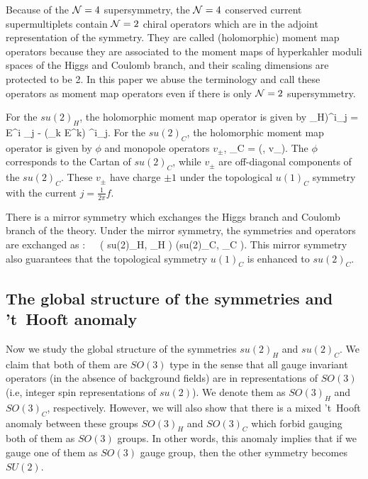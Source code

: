 \documentclass[a4paper,11pt]{article}
\def\CN{{\cal N}}
\def\beq#1\eeq{\begin{align}#1\end{align}}
\begin{document}
Because of the $\CN=4$ supersymmetry, the $\CN=4$ conserved current supermultiplets contain $\CN=2$ chiral operators which are in the adjoint representation of the symmetry.
They are called (holomorphic) moment map operators because they are associated to the moment maps of hyperkahler moduli spaces of the Higgs and Coulomb branch,
and their scaling dimensions are protected to be 2. In this paper we abuse the terminology 
and call these operators as moment map operators even if there is only $\CN=2$ supersymmetry.

For the $su(2)_H$, the holomorphic moment map operator is given by
\beq
(\mu_H)^i_j = E^i _j - (_k E^k) \delta^i_j.
\eeq
For the $su(2)_C$, the holomorphic moment map operator is given by $\phi$ and monopole operators $v_\pm$,
\beq
\mu_C = (\phi, v_\pm).
\eeq
The $\phi$ corresponds to the Cartan of $su(2)_C$, while $v_\pm$ are off-diagonal components of the $su(2)_C$.
These $v_\pm$ have charge $\pm 1$ under the topological $u(1)_C$ symmetry with the current $ j =  \frac{1}{2\pi }f$.

There is a mirror symmetry which exchanges the Higgs branch and Coulomb branch of the theory.
Under the mirror symmetry, the symmetries and operators are exchanged as
\beq
\text{mirror}:~~~\left( su(2)_H, \mu_H \right) \longleftrightarrow \left(su(2)_C, \mu_C \right).
\eeq
This mirror symmetry also guarantees that the topological symmetry $u(1)_C$ is enhanced to $su(2)_C$.


\subsection{The global structure of the symmetries and 't~Hooft anomaly}
Now we study the global structure of the symmetries $su(2)_H$ and $su(2)_C$.
We claim that both of them are $SO(3)$ type in the sense that all gauge invariant operators (in the absence of background fields) 
are in representations of $SO(3)$ (i.e, integer spin representations of $su(2)$).
We denote them as  $SO(3)_H$ and $SO(3)_C$, respectively. However, we will also show that there is a mixed 't~Hooft anomaly between these groups $SO(3)_H$ and $SO(3)_C$
which forbid gauging both of them as $SO(3)$ groups. In other words, this anomaly implies that if we gauge one of them as $SO(3)$ gauge group, then the other symmetry becomes $SU(2)$.
\end{document}
